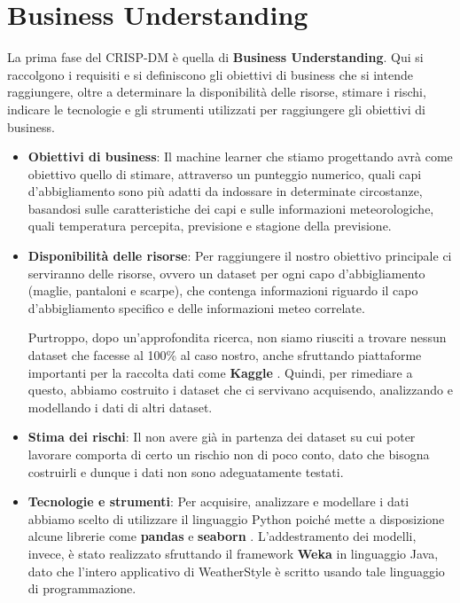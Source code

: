 \documentclass[a4paper, 11pt, oneside]{report}
\begin{document}
            \section{Business Understanding}
            La prima fase del CRISP-DM è quella di \textbf{Business Understanding}.
            Qui si raccolgono i requisiti e si definiscono gli obiettivi di business che si intende raggiungere, oltre a
            determinare la disponibilità delle risorse, stimare i rischi, indicare le tecnologie e gli strumenti utilizzati
            per raggiungere gli obiettivi di business.
            \par \noindent
            \begin{itemize}
                \item \textbf{Obiettivi di business}: Il machine learner che stiamo progettando avrà come obiettivo quello di
                stimare, attraverso un punteggio numerico, quali capi d'abbigliamento sono più adatti da indossare in
                determinate circostanze, basandosi
                sulle caratteristiche dei capi e sulle informazioni meteorologiche, quali temperatura percepita, previsione e
                stagione della previsione.
                \item \textbf{Disponibilità delle risorse}: Per raggiungere il nostro obiettivo principale ci serviranno
                delle risorse, ovvero un dataset per ogni capo d'abbigliamento (maglie, pantaloni e scarpe),
                che contenga informazioni riguardo il capo d'abbigliamento specifico e delle informazioni meteo correlate.
                \par \noindent Purtroppo, dopo un'approfondita ricerca, non siamo riusciti a trovare nessun dataset che facesse
                al 100\% al caso nostro, anche sfruttando piattaforme importanti per la raccolta dati come \textbf{Kaggle} \cite{3}.
                Quindi, per rimediare a questo, abbiamo costruito i dataset che ci servivano acquisendo, analizzando e modellando
                i dati di altri dataset.
                \item \textbf{Stima dei rischi}: Il non avere già in partenza dei dataset su cui poter lavorare comporta
                di certo un rischio non di poco conto, dato che bisogna costruirli e dunque i dati non sono adeguatamente testati.
                \item \textbf{Tecnologie e strumenti}: Per acquisire, analizzare e modellare i dati abbiamo scelto di utilizzare
                il linguaggio Python poiché mette a disposizione alcune librerie come \textbf{pandas} \cite{4} e \textbf{seaborn} \cite{5}.
                L'addestramento dei modelli, invece, è stato realizzato
                sfruttando il framework \textbf{Weka} \cite{2} in linguaggio Java, dato che l'intero applicativo di WeatherStyle
                è scritto usando tale linguaggio di programmazione.
            \end{itemize}
\end{document}
